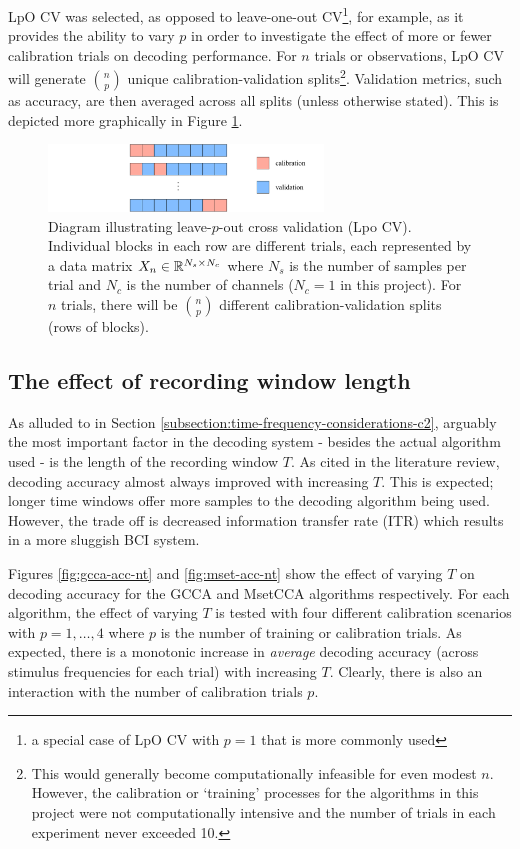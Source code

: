 LpO CV was selected, as opposed to leave-one-out CV\footnote{a special case of LpO CV with $p=1$ that is more commonly used}, for example, as it provides the ability to vary $p$ in order to investigate the effect of more or fewer calibration trials on decoding performance. For $n$ trials or observations, LpO CV will generate $\binom{n}{p}$ unique calibration-validation splits\footnote{This would generally become computationally infeasible for even modest $n$. However, the calibration or `training' processes for the algorithms in this project were not computationally intensive and the number of trials in each experiment never exceeded 10.}. Validation metrics, such as accuracy, are then averaged across all splits (unless otherwise stated). This is depicted more graphically in Figure \ref{fig:lpocv-diagram}.
\begin{figure}[h]
    \centering
    \includegraphics[width=0.65\textwidth]{LpoCV}
    \caption[Leave-$p$-out cross validation (Lpo CV)]{Diagram illustrating leave-$p$-out cross validation (Lpo CV). Individual blocks in each row are different trials, each represented by a data matrix $X_n\in\mathbb{R}^{N_s\times N_c}$ where $N_s$ is the number of samples per trial and $N_c$ is the number of channels ($N_c=1$ in this project). For $n$ trials, there will be $\binom{n}{p}$ different calibration-validation splits (rows of blocks).}
    \label{fig:lpocv-diagram}
\end{figure}

\subsection{The effect of recording window length}
As alluded to in Section \ref{subsection:time-frequency-considerations-c2}, arguably the most important factor in the decoding system - besides the actual algorithm used - is the length of the recording window $T$. As cited in the literature review, decoding accuracy almost always improved with increasing $T$. This is expected; longer time windows offer more samples to the decoding algorithm being used. However, the trade off is decreased information transfer rate (ITR) which results in a more sluggish BCI system. 

Figures \ref{fig:gcca-acc-nt} and \ref{fig:mset-acc-nt} show the effect of varying $T$ on decoding accuracy for the GCCA and MsetCCA algorithms respectively. For each algorithm, the effect of varying $T$ is tested with four different calibration scenarios with $p=1,\dots,4$ where $p$ is the number of training or calibration trials. As expected, there is a monotonic increase in \textit{average} decoding accuracy (across stimulus frequencies for each trial) with increasing $T$. Clearly, there is also an interaction with the number of calibration trials $p$.

